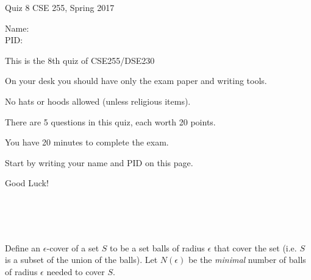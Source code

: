 \documentclass[10pt]{article}
\begin{document}
\setlength\parindent{0pt}
\thispagestyle{empty}

{\textbf \Large Quiz 8} \hfill CSE 255, Spring 2017
\\

\vspace{.1in}

Name: \underline{\hspace{3in}}
\\

PID: \underline{\hspace{3.15in}}

\vspace{.1in}

{\small \setlength\parindent{20pt}This is the 8th quiz of CSE255/DSE230

  On your desk you should have only the exam paper and writing tools.
  
No hats or hoods allowed (unless religious items).

There are 5 questions in this quiz, each worth 20 points.

You have 20 minutes to complete the exam.

Start by writing your name and PID on this page.

Good Luck!}\\
\underline{\hspace{6in}}

\newcommand{\uu}{\vec{u}}
\newcommand{\xx}{\vec{x}}
\newcommand{\yy}{\vec{y}}
\newcommand{\vmu}{\vec{\mu}}
~\\
~\\
\noindent
   Define an $\epsilon$-cover of a set
    $S$ to be a set balls of radius $\epsilon$ that
    cover the set (i.e. $S$ is a subset of the union of the
    balls). Let $N(\epsilon)$ be the {\em minimal} number of balls of
    radius $\epsilon$ needed to cover $S$.
\end{document}
